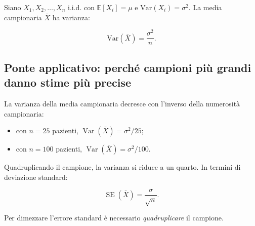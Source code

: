 \documentclass[
  italian,
  letterpaper,
  a4paper,
  11pt,
  open=any]{scrbook}
\providecommand{\tightlist}{%
  \setlength{\itemsep}{0pt}\setlength{\parskip}{0pt}}
\theoremstyle{plain}
\theoremstyle{definition}
\theoremstyle{definition}
\theoremstyle{remark}
\begin{document}
Siano \(X_1, X_2, \ldots, X_n\) i.i.d. con \(\mathbb{E}[X_i] = \mu\) e
\(\text{Var}(X_i) = \sigma^2\). La media campionaria \(\bar{X}\) ha
varianza:

\[
\text{Var}(\bar{X}) = \frac{\sigma^2}{n}.
\]

\subsection{Ponte applicativo: perché campioni più grandi danno stime
più
precise}\label{ponte-applicativo-perchuxe9-campioni-piuxf9-grandi-danno-stime-piuxf9-precise}

La varianza della media campionaria decresce con l'inverso della
numerosità campionaria:

\begin{itemize}
\tightlist
\item
  con \(n = 25\) pazienti,
  \(\operatorname{Var}(\bar{X}) = \sigma^2/25\);
\item
  con \(n = 100\) pazienti,
  \(\operatorname{Var}(\bar{X}) = \sigma^2/100\).
\end{itemize}

Quadruplicando il campione, la varianza si riduce a un quarto. In
termini di deviazione standard:

\[
\operatorname{SE}(\bar{X}) = \frac{\sigma}{\sqrt{n}}.
\]

Per dimezzare l'errore standard è necessario \emph{quadruplicare} il
campione.
\end{document}
